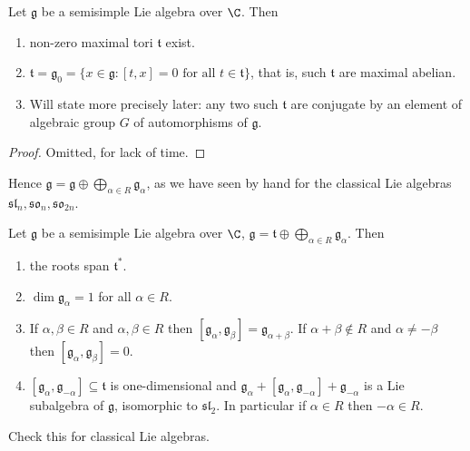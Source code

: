 \documentclass[a4paper]{article}
\newcommand*{\Lie}[1]{\mathfrak{#1}} %
\begin{document}
\begin{proposition}
  Let \(\Lie g\) be a semisimple Lie algebra over \(\C\). Then
  \begin{enumerate}
  \item non-zero maximal tori \(\Lie t\) exist.
  \item \(\Lie t = \Lie g_0 = \{x \in \Lie g: [t, x] = 0 \text{ for all } t \in \Lie t\}\), that is, such \(\Lie t\) are maximal abelian.
  \item Will state more precisely later: any two such \(\Lie t\) are conjugate by an element of algebraic group \(G\) of automorphisms of \(\Lie g\).
  \end{enumerate}
\end{proposition}

\begin{proof}
  Omitted, for lack of time.
\end{proof}

Hence \(\Lie g = \Lie g \oplus \bigoplus_{\alpha \in R} \Lie g_\alpha\), as we have seen by hand for the classical Lie algebras \(\Lie{sl}_n, \Lie{so}_n, \Lie{so}_{2n}\).

\begin{theorem}
  Let \(\Lie g\) be a semisimple Lie algebra over \(\C\), \(\Lie g = \Lie t \oplus \bigoplus_{\alpha \in R} \Lie g_\alpha\). Then
  \begin{enumerate}
  \item the roots span \(\Lie t^*\).
  \item \(\dim \Lie g_\alpha = 1\) for all \(\alpha \in R\).
  \item If \(\alpha, \beta \in R\) and \(\alpha, \beta \in R\) then \([\Lie g_\alpha, \Lie g_\beta] = \Lie g_{\alpha + \beta}\). If \(\alpha + \beta \notin R\) and \(\alpha \ne -\beta\) then \([\Lie g_\alpha, \Lie g_\beta] = 0\).
  \item \([\Lie g_\alpha, \Lie g_{-\alpha}] \subseteq \Lie t\) is one-dimensional and \(\Lie g_\alpha + [\Lie g_\alpha, \Lie g_{-\alpha}] + \Lie g_{-\alpha}\) is a Lie subalgebra of \(\Lie g\), isomorphic to \(\Lie{sl}_2\). In particular if \(\alpha \in R\) then \(-\alpha \in R\).
  \end{enumerate}
\end{theorem}

\begin{ex}
  Check this for classical Lie algebras.
\end{ex}
\end{document}
